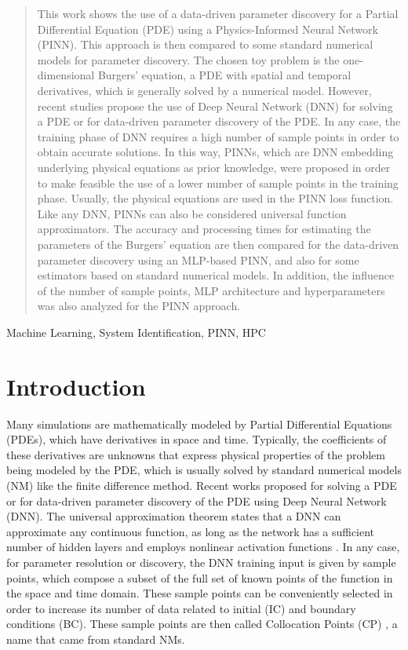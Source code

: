 \documentclass[conference]{IEEEtran}
\begin{document}
\begin{abstract}
This work shows the use of a data-driven parameter discovery for a Partial Differential Equation (PDE) using a Physics-Informed Neural Network (PINN). This approach is then compared to some standard numerical models for parameter discovery.
The chosen toy problem is the one-dimensional Burgers' equation, a PDE with spatial and temporal derivatives, which is generally solved by a numerical model. However, recent studies propose the use of Deep Neural Network (DNN) for solving a PDE or for data-driven parameter discovery of the PDE. In any case, the training phase of DNN requires a high number of sample points in order to obtain accurate solutions. In this way, PINNs, which are DNN embedding underlying physical equations as prior knowledge, were proposed in order to make feasible the use of a lower number of sample points in the training phase. Usually, the physical equations are used in the PINN loss function. Like any DNN, PINNs can also be considered universal function approximators. The accuracy and processing times for estimating the parameters of the Burgers' equation are then compared for the data-driven parameter discovery using an MLP-based PINN, and also for some estimators based on standard numerical models. In addition, the influence of the number of sample points, MLP architecture and hyperparameters was also analyzed for the PINN approach.
\end{abstract}

\begin{IEEEkeywords}
Machine Learning, System Identification, PINN, HPC
\end{IEEEkeywords}

\section{Introduction}
\label{sec:intr}

Many simulations are mathematically modeled by Partial Differential Equations (PDEs), which have derivatives in space and time. Typically, the coefficients of these derivatives are unknowns that express physical properties of the problem being modeled by the PDE, which is usually solved by standard numerical models (NM) like the finite difference method. Recent works proposed for solving a PDE or for data-driven parameter discovery of the PDE using Deep Neural Network (DNN). The universal approximation theorem states that a DNN can approximate any continuous function, as long as the network has a sufficient number of hidden layers and employs nonlinear activation functions \cite{Hornik1989}. In any case, for parameter resolution or discovery, 
the DNN training input is given by sample points, which compose a subset of the full set of known points of the function in the space and time domain. These sample points can be conveniently selected in order to increase its number of data related to initial (IC) and boundary conditions (BC). These sample points are then called Collocation Points (CP) \cite{Basdevant1986}, a name that came from standard NMs. 
\end{document}
